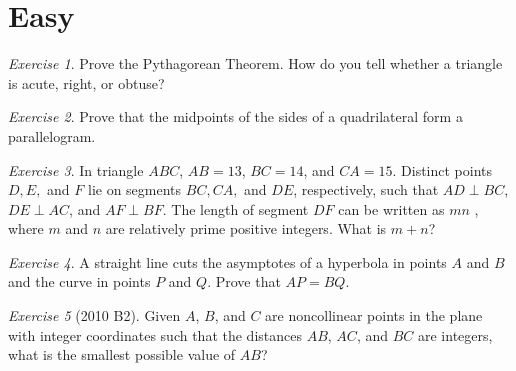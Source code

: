 \documentclass{article}
\theoremstyle{definition}
\theoremstyle{remark}
\newtheorem{exercise}{Exercise}
\begin{document}
\section{Easy}
\begin{exercise}
Prove the Pythagorean Theorem. How do you tell whether a triangle is acute, right, or obtuse?  
\end{exercise}
\begin{exercise}
Prove that the midpoints of the sides of a quadrilateral form a parallelogram.
\end{exercise}

\begin{exercise}
In triangle $ABC$, $AB = 13$, $BC = 14$, and $CA = 15$. Distinct points $D, E,$ and $F$ lie on segments $BC, CA,$ and $DE$, respectively, such that $AD \perp BC$, $DE \perp AC$, and $AF \perp BF$. The length of segment $DF$ can be written as $mn$ , where $m$ and $n$ are relatively prime positive integers. What is $m + n$?
\end{exercise}

\begin{exercise}
A straight line cuts the asymptotes of a hyperbola in points $A$ and $B$ and the curve in points $P$ and $Q$. Prove that $AP = BQ$.   
\end{exercise}

\begin{exercise}[2010 B2]
Given $A$, $B$, and $C$ are noncollinear points in the plane with integer coordinates such that the distances $AB$, $AC$, and $BC$ are integers, what is the smallest possible value of $AB$?
\end{exercise}
\end{document}
